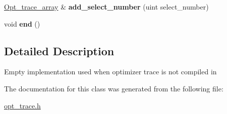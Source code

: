 \begin{DoxyCompactItemize}
\item 
\mbox{\label{classOpt__trace__array_a65a938a5d3f62c59f8650e8650bd17ff}} 
\mbox{\hyperlink{classOpt__trace__array}{Opt\+\_\+trace\+\_\+array}} \& {\bfseries add\+\_\+select\+\_\+number} (uint select\+\_\+number)
\item 
\mbox{\label{classOpt__trace__array_a6362f600503fc46e1cc821ba5c88c08a}} 
void {\bfseries end} ()
\end{DoxyCompactItemize}


\subsection{Detailed Description}
Empty implementation used when optimizer trace is not compiled in 

The documentation for this class was generated from the following file\+:\begin{DoxyCompactItemize}
\item 
\mbox{\hyperlink{opt__trace_8h}{opt\+\_\+trace.\+h}}\end{DoxyCompactItemize}
